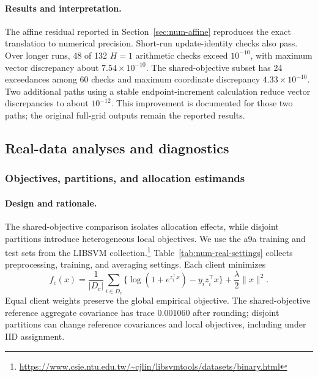 \paragraph{Results and interpretation.}
The affine residual reported in Section~\ref{sec:num-affine} reproduces
the exact translation to numerical precision. Short-run update-identity
checks also pass. Over longer runs, 48 of 132 $H=1$ arithmetic checks
exceed $10^{-10}$, with maximum vector discrepancy about
$7.54\times10^{-10}$. The shared-objective subset has 24 exceedances
among 60 checks and maximum coordinate discrepancy $4.33\times10^{-10}$.
Two additional paths using a stable endpoint-increment calculation reduce
vector discrepancies to about $10^{-12}$. This improvement is documented
for those two paths; the original full-grid outputs remain the reported
results.

\subsection{Real-data analyses and diagnostics}
\label{app:num-real-analyses}

\subsubsection{Objectives, partitions, and allocation estimands}
\label{app:supp-real}

\paragraph{Design and rationale.}
The shared-objective comparison isolates allocation effects, while disjoint
partitions introduce heterogeneous local objectives. We use the a9a
training and test sets from the LIBSVM collection.\footnote{\url{https://www.csie.ntu.edu.tw/~cjlin/libsvmtools/datasets/binary.html}}
Table~\ref{tab:num-real-settings} collects preprocessing, training, and
averaging settings. Each client minimizes
\begin{equation}
\label{eq:real-objective}
f_c(x)=\frac1{|D_c|}\sum_{i\in D_c}\{\log(1+e^{z_i^\top x})-y_i z_i^\top x\}+\frac{\lambda}{2}\|x\|^2.
\end{equation}
Equal client weights preserve the global empirical objective. The
shared-objective reference aggregate covariance has trace $0.001060$
after rounding; disjoint partitions can change reference covariances and
local objectives, including under IID assignment.

